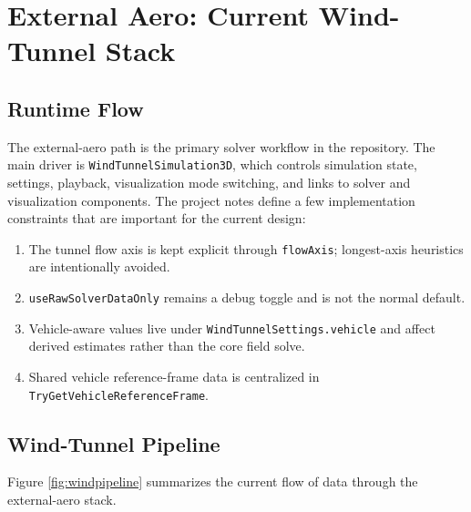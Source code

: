 \documentclass[12pt,a4paper,titlepage]{report}
\begin{document}
\chapter{External Aero: Current Wind-Tunnel Stack}
\section{Runtime Flow}
The external-aero path is the primary solver workflow in the repository. The main driver is \texttt{WindTunnelSimulation3D}, which controls simulation state, settings, playback, visualization mode switching, and links to solver and visualization components. The project notes define a few implementation constraints that are important for the current design:
\begin{enumerate}
\item The tunnel flow axis is kept explicit through \texttt{flowAxis}; longest-axis heuristics are intentionally avoided.
\item \texttt{useRawSolverDataOnly} remains a debug toggle and is not the normal default.
\item Vehicle-aware values live under \texttt{WindTunnelSettings.vehicle} and affect derived estimates rather than the core field solve.
\item Shared vehicle reference-frame data is centralized in \texttt{TryGetVehicleReferenceFrame}.
\end{enumerate}

\section{Wind-Tunnel Pipeline}
Figure \ref{fig:windpipeline} summarizes the current flow of data through the external-aero stack.
\end{document}
